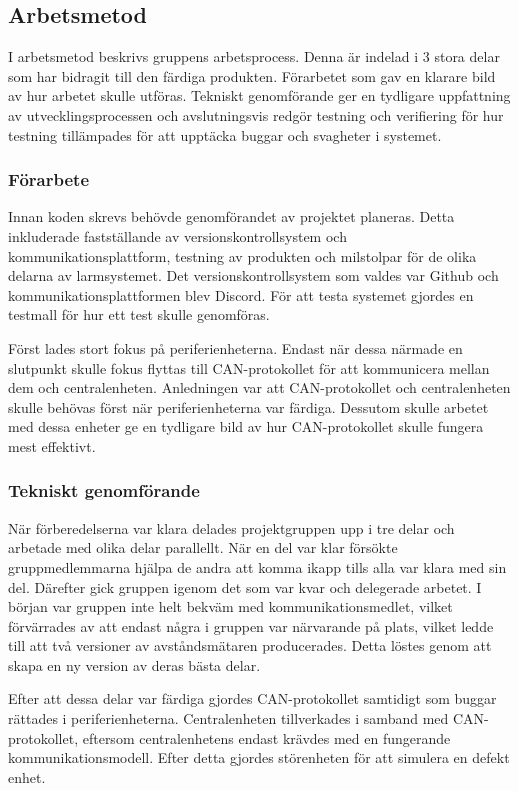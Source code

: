 \documentclass{article}
\begin{document}
\subsection{Arbetsmetod}
I arbetsmetod beskrivs gruppens arbetsprocess. Denna är indelad i 3 stora delar som har bidragit till den färdiga produkten. Förarbetet som gav en klarare bild av hur arbetet skulle utföras. Tekniskt genomförande ger en tydligare uppfattning av utvecklingsprocessen och avslutningsvis redgör testning och verifiering för hur testning tillämpades för att upptäcka buggar och svagheter i systemet.

\subsubsection{Förarbete}
Innan koden skrevs behövde genomförandet av projektet planeras. Detta inkluderade fastställande av versionskontrollsystem och kommunikationsplattform, testning av produkten och milstolpar för de olika delarna av larmsystemet. Det versionskontrollsystem som valdes var Github och kommunikationsplattformen blev Discord. För att testa systemet gjordes en testmall för hur ett test skulle genomföras.

Först lades stort fokus på periferienheterna. Endast när dessa närmade en slutpunkt skulle fokus flyttas till CAN-protokollet för att kommunicera mellan dem och centralenheten. Anledningen var att CAN-protokollet och centralenheten skulle behövas först när periferienheterna var färdiga. Dessutom skulle arbetet med dessa enheter ge en tydligare bild av hur CAN-protokollet skulle fungera mest effektivt.


\subsubsection{Tekniskt genomförande}
När förberedelserna var klara delades projektgruppen upp i tre delar och arbetade med olika delar parallellt. När en del var klar försökte gruppmedlemmarna hjälpa de andra att komma ikapp tills alla var klara med sin del. Därefter gick gruppen igenom det som var kvar och delegerade arbetet. I början var gruppen inte helt bekväm med kommunikationsmedlet, vilket förvärrades av att endast några i gruppen var närvarande på plats, vilket ledde till att två versioner av avståndsmätaren producerades. Detta löstes genom att skapa en ny version av deras bästa delar.

Efter att dessa delar var färdiga gjordes CAN-protokollet samtidigt som buggar rättades i periferienheterna. Centralenheten tillverkades i samband med CAN-protokollet, eftersom centralenhetens endast krävdes med en fungerande kommunikationsmodell. Efter detta gjordes störenheten för att simulera en defekt enhet.
\end{document}
